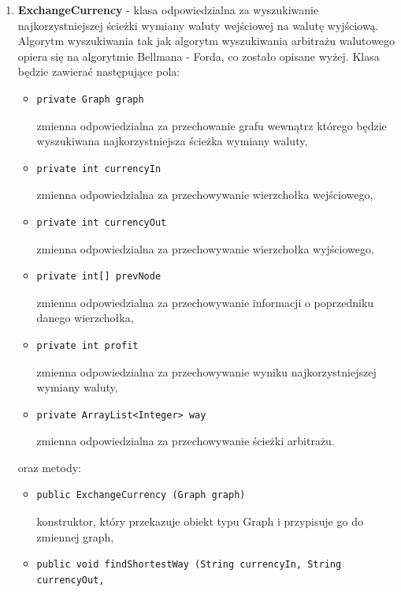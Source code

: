 ﻿\documentclass[12pt]{article}
\begin{document}
\begin{enumerate}
\begin{itemize}
    \end{itemize}
\item \textbf{ExchangeCurrency} - klasa odpowiedzialna za wyszukiwanie najkorzystniejszej ścieżki wymiany waluty wejściowej na walutę wyjściową. Algorytm wyszukiwania tak jak algorytm wyszukiwania arbitrażu walutowego opiera się na algorytmie Bellmana - Forda, co zostało opisane wyżej. Klasa będzie zawierać następujące pola:
    \begin{itemize}
        \item \begin{verbatim}private Graph graph\end{verbatim}
        zmienna odpowiedzialna za przechowanie grafu wewnątrz którego będzie wyszukiwana najkorzystniejsza ścieżka wymiany waluty,
    \item \begin{verbatim}private int currencyIn\end{verbatim}
        zmienna odpowiedzialna za przechowywanie wierzchołka wejściowego,
    \item \begin{verbatim}private int currencyOut \end{verbatim}
        zmienna odpowiedzialna za przechowywanie wierzchołka wyjściowego,
    \item \begin{verbatim}private int[] prevNode\end{verbatim}
        zmienna odpowiedzialna za przechowywanie  informacji o poprzedniku danego wierzchołka,
    \item \begin{verbatim}private int profit\end{verbatim}
        zmienna odpowiedzialna za przechowywanie wyniku najkorzystniejszej wymiany waluty,
    \item \begin{verbatim}private ArrayList<Integer> way\end{verbatim}
        zmienna odpowiedzialna za przechowywanie ścieżki arbitrażu.
    \end{itemize}
    oraz metody:
    \begin{itemize}
        \item \begin{verbatim}public ExchangeCurrency (Graph graph)\end{verbatim}
        konstruktor, który przekazuje obiekt typu Graph i przypisuje go do zmiennej graph,
         \item \begin{verbatim}public void findShortestWay (String currencyIn, String currencyOut,

\end{verbatim}
\end{itemize}
\end{enumerate}
\end{document}
